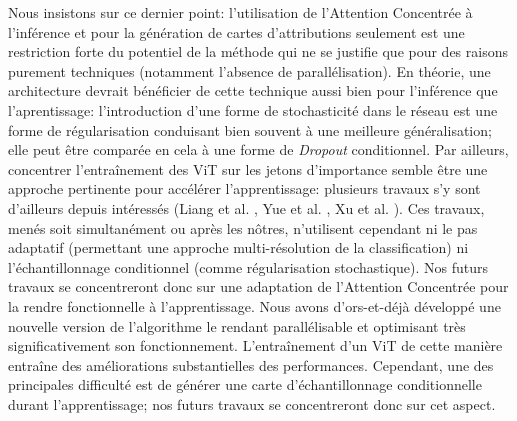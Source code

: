 Nous insistons sur ce dernier point: l'utilisation de l'Attention Concentrée à l'inférence et pour la génération de cartes d'attributions seulement est une restriction forte du potentiel de la méthode qui ne se justifie que pour des raisons purement techniques (notamment l'absence de parallélisation). En théorie, une architecture devrait bénéficier de cette technique aussi bien pour l'inférence que l'aprentissage: l'introduction d'une forme de stochasticité dans le réseau est une forme de régularisation conduisant bien souvent à une meilleure généralisation; elle peut être comparée en cela à une forme de \textit{Dropout} conditionnel. Par ailleurs, concentrer l'entraînement des ViT sur les jetons d'importance semble être une approche pertinente pour accélérer l'apprentissage: plusieurs travaux s'y sont d'ailleurs depuis intéressés (Liang et al. \cite{liangNotAllPatches2022a}, Yue et al. \cite{yueVisionTransformerProgressive2021}, Xu et al. \cite{evo-vit}). Ces travaux, menés soit simultanément ou après les nôtres, n'utilisent cependant ni le pas adaptatif (permettant une approche multi-résolution de la classification) ni l'échantillonnage conditionnel (comme régularisation stochastique). Nos futurs travaux se concentreront donc sur une adaptation de l'Attention Concentrée pour la rendre fonctionnelle à l'apprentissage. Nous avons d'ors-et-déjà développé une nouvelle version de l'algorithme le rendant parallélisable et optimisant très significativement son fonctionnement. L'entraînement d'un ViT de cette manière entraîne des améliorations substantielles des performances. Cependant, une des principales difficulté est de générer une carte d'échantillonnage conditionnelle durant l'apprentissage; nos futurs travaux se concentreront donc sur cet aspect. 
